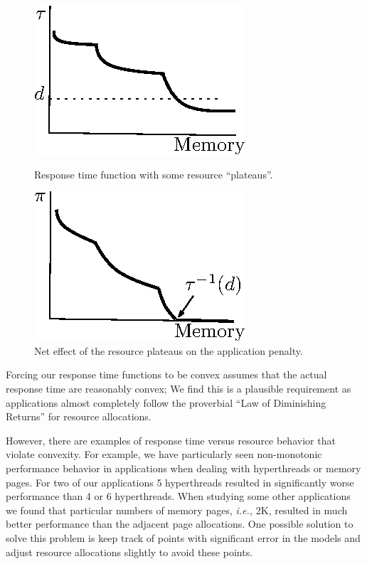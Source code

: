 \begin{figure}[hb]
\parbox{1.6in}{
\includegraphics*{Plateau1.eps}
\caption{\label{f:plat}Response time function with some resource ``plateaus''.}
}
\hspace{\fill}
\parbox{1.6in}{
\includegraphics*{Plateau2.eps}
\caption{\label{f:plateffect}Net effect of the resource plateaus on the application penalty.}
}
\end{figure}

Forcing our response time functions to be convex assumes that the actual response time are reasonably convex; We find this is a plausible requirement as applications almost completely follow the proverbial ``Law of Diminishing Returns'' for resource allocations.   

However, there are examples of response time versus resource behavior that violate convexity.   For example, we have particularly seen non-monotonic performance behavior in applications when dealing with hyperthreads or memory pages.  For two of our applications 5 hyperthreads resulted in significantly worse performance than 4 or 6 hyperthreads.  When studying some other applications we found that particular numbers of memory pages, \emph{i.e.,} 2K, resulted in much better performance than the adjacent page allocations.  One possible solution to solve this problem is keep track of points with significant error in the models and adjust resource allocations slightly to avoid these points.

